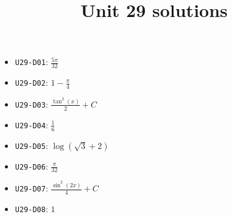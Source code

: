 \title{Unit 29 solutions}\maketitle\begin{itemize}
  \item \texttt{U29-D01}: $\frac{5 \pi}{32}$
  \item \texttt{U29-D02}: $1 - \frac{\pi}{4}$
  \item \texttt{U29-D03}: $\frac{\tan^{2}{\left(x \right)}}{2}+C$
  \item \texttt{U29-D04}: $\frac{1}{6}$
  \item \texttt{U29-D05}: $\log{\left(\sqrt{3} + 2 \right)}$
  \item \texttt{U29-D06}: $\frac{\pi}{32}$
  \item \texttt{U29-D07}: $\frac{\sin^{2}{\left(2 x \right)}}{4}+C$
  \item \texttt{U29-D08}: $1$
\end{itemize}
